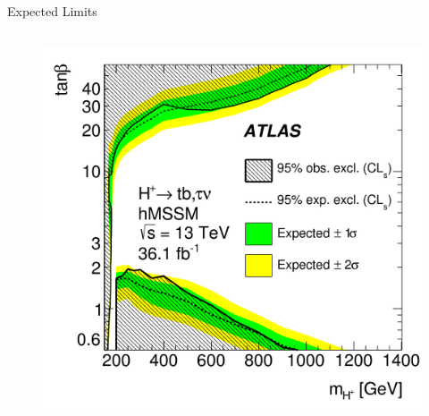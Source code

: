 \documentclass[aspectratio=169,xcolor=table]{beamer}
\begin{document}
   \begin{frame}{\Hpm Expected Limits}
    \centering
    \small
    \begin{columns}
      \begin{figure}
      \centering
      \includegraphics[width=\textwidth,keepaspectratio=true]{HPlus_taunu_tb_tanb_Limits_hMSSM.png} 
      \caption{\tiny \cite{ATLAS-HPlus-tb-36ifb}}
      \end{figure}


\end{columns}
\end{frame}
\end{document}

